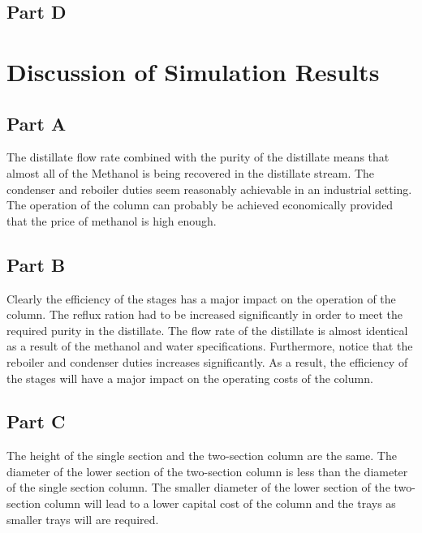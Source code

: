\documentclass[12pt]{article}
\begin{document}
\subsection{Part D}

\section{Discussion of Simulation Results}

\subsection{Part A}
The distillate flow rate combined with the purity of the distillate means that almost all of the Methanol is being recovered in the distillate stream. The condenser and reboiler duties seem reasonably achievable in an industrial setting. The operation of the column can probably be achieved economically provided that the price of methanol is high enough.

\subsection{Part B}
Clearly the efficiency of the stages has a major impact on the operation of the column. The reflux ration had to be increased significantly in order to meet the required purity in the distillate. The flow rate of the distillate is almost identical as a result of the methanol and water specifications. Furthermore, notice that the reboiler and condenser duties increases significantly. As a result, the efficiency of the stages will have a major impact on the operating costs of the column.

\subsection{Part C}
The height of the single section and the two-section column are the same. The diameter of the lower section of the two-section column is less than the diameter of the single section column. The smaller diameter of the lower section of the two-section column will lead to a lower capital cost of the column and the trays as smaller trays will are required.
\end{document}
